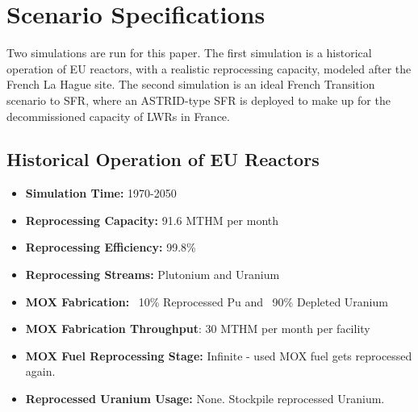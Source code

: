 \section{Scenario Specifications}

Two simulations are run for this paper.
The first simulation is a historical operation of EU reactors, with a
realistic reprocessing capacity, modeled after the French La Hague site.
The second simulation is an ideal French Transition scenario to \gls{SFR},
where an ASTRID-type \gls{SFR} is deployed to make up for the decommissioned
capacity of \glspl{LWR} in France.

\subsection{Historical Operation of EU Reactors}
\begin{itemize}
	\item \textbf{Simulation Time:}  1970-2050 
	\item \textbf{Reprocessing Capacity:}  91.6 MTHM per month \cite{schneider_spent_2008}  
	\item \textbf{Reprocessing Efficiency:}  99.8\%  
	\item \textbf{Reprocessing Streams:}  Plutonium and Uranium  
	\item \textbf{\gls{MOX} Fabrication:}  ~10\% Reprocessed Pu and ~90\% Depleted Uranium  
	\item \textbf{\gls{MOX} Fabrication Throughput}: 30 MTHM per month per facility \cite{hugelmann_melox_1999}
	\item \textbf{\gls{MOX} Fuel Reprocessing Stage:}  Infinite - used \gls{MOX} fuel gets reprocessed again.  
	\item\textbf{Reprocessed Uranium Usage:}  None. Stockpile reprocessed Uranium. \\
\end{itemize} 

